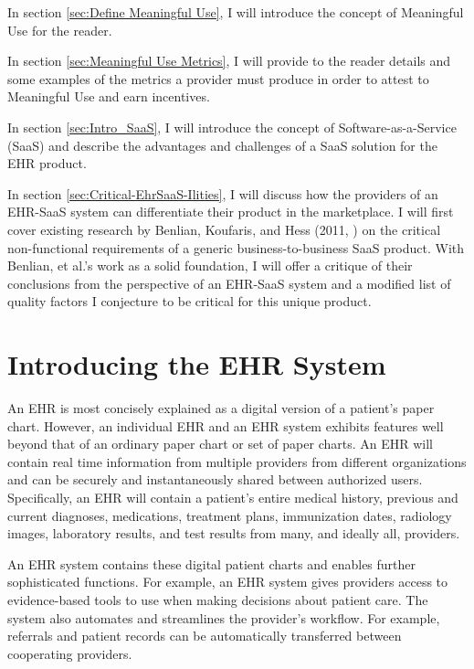 \documentclass[10pt]{article}
\begin{document}
In section \ref{sec:Define Meaningful Use}, I will introduce the concept of Meaningful Use for the reader.

In section \ref{sec:Meaningful Use Metrics}, I will provide to the reader details and some examples of the metrics a provider must produce in order to attest to Meaningful Use and earn incentives.

In section \ref{sec:Intro_SaaS}, I will introduce the concept of Software-as-a-Service (SaaS) and describe the advantages and challenges of a SaaS solution for the EHR product.

In section \ref{sec:Critical-EhrSaaS-Ilities}, I will discuss how the providers of an EHR-SaaS system can differentiate their product in the marketplace. 
I will first cover existing research by Benlian, Koufaris, and Hess (2011, \cite{saasqual}) on the critical non-functional requirements of a generic business-to-business SaaS product.
With Benlian, et al.'s work as a solid foundation, I will offer a critique of their conclusions from the perspective of an EHR-SaaS system and a modified list of quality factors I conjecture to be critical for this unique product.

\section{Introducing the EHR System}
\label{sec:Intro_EHR}

An EHR is most concisely explained as a digital version of a patient's paper chart.
However, an individual EHR and an EHR system exhibits features well beyond that of an ordinary paper chart or set of paper charts.
An EHR will contain real time information from multiple providers from different organizations and can be securely and instantaneously shared between authorized users.
Specifically, an EHR will contain a patient's entire medical history, previous and current diagnoses, medications, treatment plans, immunization dates, radiology images, laboratory results, and test results from many, and ideally all, providers.

An EHR system contains these digital patient charts and enables further sophisticated functions.
For example, an EHR system gives providers access to evidence-based tools to use when making decisions about patient care.
The system also automates and streamlines the provider's workflow. For example, referrals and patient records can be automatically transferred between cooperating providers.
\cite{healthit-ehr}
\end{document}
